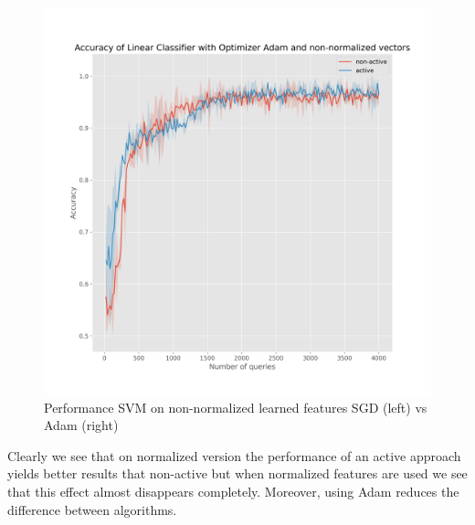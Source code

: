 \documentclass{article}
\begin{document}
\begin{figure}[t]
\begin{minipage}{.45\textwidth}
    \includegraphics[width=\linewidth]{active-vs-base-moons-linear-loss-Adam-non-normalized-ci}
  \end{minipage}
  \caption{Performance SVM on non-normalized learned features SGD (left) vs Adam (right)}\label{fig:svm-non-normalized-ci}
\end{figure}

Clearly we see that on normalized version the performance of an active approach yields better results that non-active
but when normalized features are used we see that this effect almost disappears completely.
Moreover, using Adam reduces the difference between algorithms.
\end{document}
